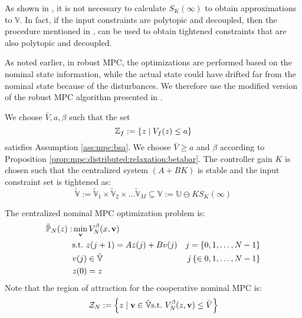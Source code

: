 \begin{remark}
As shown in \citet{rakovic:kerrigan:kouramas:mayne:2003}, it is not necessary to
calculate $S_K(\infty)$ to obtain approximations to $\mathbb{V}$. In
fact, if the input constraints are polytopic and decoupled, then the
procedure mentioned in
\citet{rakovic:kerrigan:kouramas:mayne:2003}, can be used to obtain
tightened constraints that  are also polytopic and decoupled.
\end{remark} 

As noted earlier, in robust MPC, the optimizations are performed based
on the nominal state information, while the actual state could have
drifted far from the nominal state because of the disturbances. We
therefore use the modified version of the robust MPC algorithm
presented in \citet[P.234]{rawlings:mayne:2009}. 

We choose $\bar{V}, a, \beta$ such that the set 
\[\mathbb{Z}_f := \left\lbrace z \mid V_f(z) \leq a \right\rbrace \]
satisfies Assumption \ref{ass:mpc:bsa}. We choose $\bar{V} \geq a$ and
$\beta$ according to Proposition
\ref{prop:mpc:distributed:relaxation:betabar}. The controller gain $K$
is chosen such that the centralized system $(A+BK)$ is stable and the input constraint
set is tightened as:
\[ \tilde{\mathbb{V}} := \tilde{\mathbb{V}}_1 \times
\tilde{\mathbb{V}}_2 \times \ldots \tilde{\mathbb{V}}_M \subseteq
\mathbb{V} := \mathbb{U} \ominus KS_K(\infty) \]


The centralized nominal MPC optimization problem is: 
\begin{align}
\tilde{\mathbb{P}}_N(z): & \min_{\mathbf{v}}V^\beta_N(x,\mathbf{v}) \nonumber \\
& \text{s.t.~} z(j+1) = Az(j) + Bv(j)&   j  =  \left\lbrace 0,1,\ldots,N-1 \right\rbrace\nonumber\\
& v(j) \in \tilde{\mathbb{V}}&  j \left\lbrace \in 0,1,\ldots,N-1 \right\rbrace  \label{eq:mpc:PNzbeta} \\
& z(0) = z \nonumber
\end{align}
Note that the region of attraction for the cooperative nominal MPC is:
\[ \mathcal{Z}_N : = \left\lbrace z \mid \mathbf{v} \in \tilde{\mathbb{V}} \text{s.t.~}
 V_N^\beta(z,\mathbf{v}) \leq \bar{V} \right\rbrace\]

